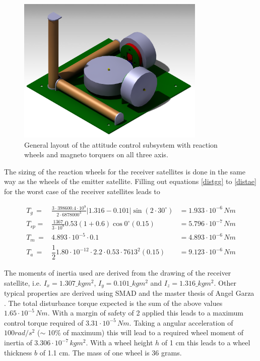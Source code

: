 \begin{figure} [h]
\centering
\includegraphics[width=0.8\textwidth, bb=0 0 1106px 861px]{chapters/img/AC_setup.png}
\caption[General layout of the attitude control subsystem]{General layout of the attitude control subsystem with reaction wheels and magneto torquers on all three axis.}
\label{fig:catacs}
\end{figure}

The sizing of the reaction wheels for the receiver satellites is done in the same way as the wheels of the emitter satellite. Filling out equations \ref{distgg} to \ref{distae} for the worst case of the receiver satellites leads to

\begin{eqnarray*}
T_g \,=& \frac{3\cdot 398600.4\cdot 10^9}{2\cdot 6878000^3} \left| 1.316 - 0.101 \right| \sin{\left(2\cdot 30^\circ \right)} &= 1.933\cdot 10^{-6}\,Nm\\
T_{sp} =& \frac{1367}{3\cdot 10^8}0.53\left(1+0.6\right)\cos{0^\circ}\left(0.15\right) &= 5.796 \cdot 10^{-7}\,Nm\\
T_m \,=& 4.893\cdot 10^{-5} \cdot 0.1  &= 4.893 \cdot 10^{-6}\,Nm\\
T_a \,=& \dfrac{1}{2} 1.80 \cdot 10^{-12}\cdot 2.2\cdot 0.53 \cdot 7613^2 \left(0.15\right) &= 9.123 \cdot 10^{-6}\,Nm
\end{eqnarray*}

The moments of inertia used are derived from the drawing of the receiver satellite, i.e. $I_x = 1.307\_kgm^2$,  $I_y = 0.101\_kgm^2$ and $I_z = 1.316\_kgm^2$. Other typical properties are derived using SMAD \cite{larson} and the master thesis of Angel Garza \cite{wheelmotor}. The total disturbance torque expected is the sum of the above values $1.65 \cdot 10^{-5}\,Nm$. With a margin of safety of 2 applied this leads to a maximum control torque required of $3.31\cdot 10^{-5}\, Nm$. Taking a angular acceleration of $100 rad/s^2$ ($\sim$ 10\% of maximum) this will lead to a required wheel moment of inertia of $3.306\cdot 10^{-7}\,kgm^2$. With a wheel height $h$ of 1 cm this leads to a wheel thickness $b$ of 1.1 cm. The mass of one wheel is 36 grams.

